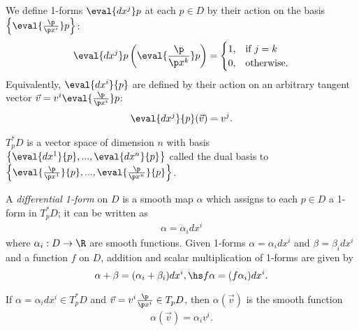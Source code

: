 \documentclass{article}
\begin{document}
\begin{definition}
    We define 1-forms $\eval{dx^j}p$ at each $p\in D$ by their action on the basis
    $\left\lbrace\eval{\frac{\p }{\p x^i}}p\right\rbrace$:
    \begin{align*}
        \eval{dx^j}p\left(\eval{\frac{\p }{\p x^k}}p\right)= \begin{cases}
            1, & \text{if } j = k  \\
            0, & \text{otherwise}.
        \end{cases}
    \end{align*}
    Equivalently, $\eval{dx^i}{p}$ are defined by their action on an arbitrary tangent vector
    $\vec v = v^i\eval{\frac{\p }{\p x^i}}p$:
    \begin{align*}
        \eval{dx^j}{p}(\vec v) = v^j.
    \end{align*}
\end{definition}

\begin{lemma}
    $T_p^*D$ is a vector space of dimension $n$ with basis
    $\left\lbrace \eval{dx^1}{p},...,\eval{dx^n}{p}\right\rbrace$ called the dual basis to
    $\left\lbrace \eval{\frac{\p }{\p x^1}}{p}, ..., \eval{\frac{\p }{\p x^n}}{p}\right\rbrace$.
\end{lemma}

\begin{definition}
    A \emph{differential 1-form} on $D$ is a smooth map $\alpha$ which assigns to each $p\in D$
    a 1-form in $T^*_pD$; it can be written as
    \begin{align*}
        \alpha = \alpha_i dx^i
    \end{align*}
    where $\alpha_i:D\to\R$ are smooth functions. Given 1-forms $\alpha=\alpha_idx^i$ and
    $\beta=\beta_idx^i$ and a function $f$ on $D$, addition and scalar multiplication of
    1-forms are given by
    \begin{align*}
        \alpha + \beta = (\alpha_i + \beta_i)dx^i,\hs f\alpha = (f\alpha_i)dx^i.
    \end{align*}
\end{definition}

\begin{lemma}[Notes 4.16]
    If $\alpha=\alpha_i dx^i\in T_p^*D$ and $\vec v=v^i\frac{\p }{\p x^i}\in T_pD$,
    then $\alpha(\vec v)$ is the smooth function
    \begin{align*}
        \alpha(\vec v) = \alpha_i v^i.
    \end{align*}
\end{lemma}
\end{document}
